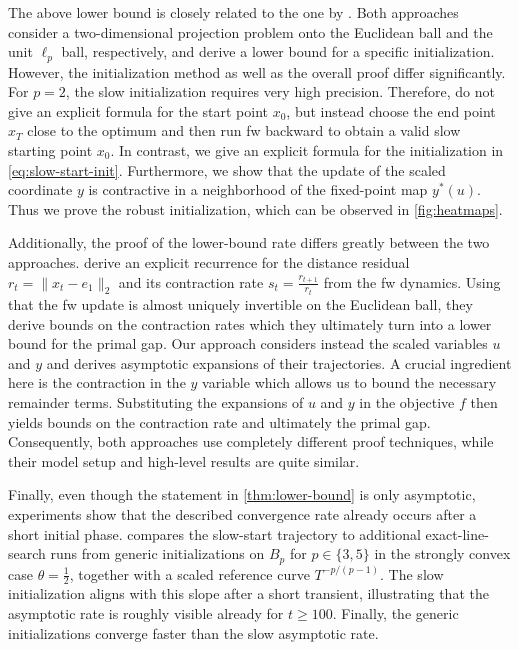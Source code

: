 \documentclass{article}
\begin{document}
The above lower bound is closely related to the one by \citet{halbey2026lower}.
Both approaches consider a two-dimensional projection problem onto the Euclidean ball and the unit $\ell_p$ ball, respectively, and derive a lower bound for a specific initialization.
However, the initialization method as well as the overall proof differ significantly.
For $p=2$, the slow initialization requires very high precision.
Therefore, \citet{halbey2026lower} do not give an explicit formula for the start point $x_0$, but instead choose the end point $x_T$ close to the optimum and then run \gls{fw} backward to obtain a valid slow starting point $x_0$.
In contrast, we give an explicit formula for the initialization in \eqref{eq:slow-start-init}.
Furthermore, we show that the update of the scaled coordinate $y$ is contractive in a neighborhood of the fixed-point map $y^*(u)$.
Thus we prove the robust initialization, which can be observed in \cref{fig:heatmaps}.

Additionally, the proof of the lower-bound rate differs greatly between the two approaches.
\citet{halbey2026lower} derive an explicit recurrence for the distance residual $r_t = \|x_t - e_1\|_2$ and its contraction rate $s_t = \frac{r_{t+1}}{r_t}$ from the \gls{fw} dynamics.
Using that the \gls{fw} update is almost uniquely invertible on the Euclidean ball, they derive bounds on the contraction rates which they ultimately turn into a lower bound for the primal gap.
Our approach considers instead the scaled variables $u$ and $y$ and derives asymptotic expansions of their trajectories.
A crucial ingredient here is the contraction in the $y$ variable which allows us to bound the necessary remainder terms.
Substituting the expansions of $u$ and $y$ in the objective $f$ then yields bounds on the contraction rate and ultimately the primal gap.
Consequently, both approaches use completely different proof techniques, while their model setup and high-level results are quite similar.

Finally, even though the statement in \cref{thm:lower-bound} is only asymptotic, experiments show that the described convergence rate already occurs after a short initial phase.
 compares the slow-start trajectory to additional exact-line-search runs from generic initializations on $B_p$ for $p\in\{3,5\}$ in the strongly convex case $\theta=\tfrac12$, together with a scaled reference curve $T^{-p/(p-1)}$.
The slow initialization aligns with this slope after a short transient, illustrating that the asymptotic rate is roughly visible already for $t \geq 100$.
Finally, the generic initializations converge faster than the slow asymptotic rate.
\end{document}
